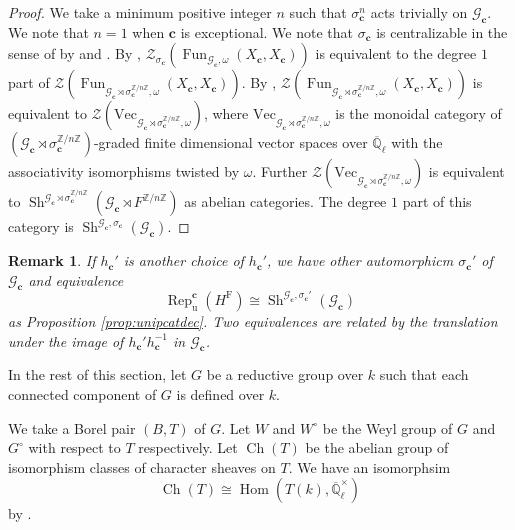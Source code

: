 \documentclass[12pt,a4paper]{article}
\newtheorem{rem}[thm]{Remark}
\DeclareMathOperator{\Hom}{Hom}
\DeclareMathOperator{\Rep}{Rep}
\DeclareMathOperator{\Sh}{Sh}
\DeclareMathOperator{\Fun}{Fun}
\DeclareMathOperator{\Ch}{Ch}
\newcommand{\mb}{\mathbb}
\newcommand{\mc}{\mathcal}
\newcommand{\mr}{\mathrm}
\newcommand{\mbf}{\mathbf}
\newcommand{\ol}{\overline}
\begin{document}
\begin{proof}
We take a minimum positive integer $n$ such that $\sigma_{\mbf{c}}^n$ acts trivially on $\mc{G}_{\mbf{c}}$. 
We note that $n=1$ when $\mbf{c}$ is exceptional. 
We note that $\sigma_{\mbf{c}}$ is centralizable in the sense of \cite[\S 5.1]{BrViQuanHopf} by \cite[Proposition 5.3]{BrViQuanHopf} and \cite[Proposition 5.1.7]{KeLyNonsemiTQFT}. 
By \cite[Theorem 5.12, Theorem 6.5]{BrViQuanHopf}, 
$\mc{Z}_{\sigma_{\mbf{c}}} (\Fun_{\mc{G}_{\mbf{c}},\omega} (X_{\mbf{c}}, X_{\mbf{c}}))$ is equivalent to the degree $1$ part of 
$\mc{Z} (\Fun_{\mc{G}_{\mbf{c}} \rtimes \sigma_{\mbf{c}}^{\mb{Z}/n\mb{Z}},\omega} (X_{\mbf{c}}, X_{\mbf{c}}))$. 
By \cite[Example 7.12.19, Corollary 7.16.2]{EGNOTenCat}, 
$\mc{Z} (\Fun_{\mc{G}_{\mbf{c}} \rtimes \sigma_{\mbf{c}}^{\mb{Z}/n\mb{Z}},\omega} (X_{\mbf{c}}, X_{\mbf{c}}))$ is equivalent to 
$\mc{Z} (\mr{Vec}_{\mc{G}_{\mbf{c}} \rtimes \sigma_{\mbf{c}}^{\mb{Z}/n\mb{Z}},\omega})$, where $\mr{Vec}_{\mc{G}_{\mbf{c}} \rtimes \sigma_{\mbf{c}}^{\mb{Z}/n\mb{Z}},\omega}$ is the monoidal category of $(\mc{G}_{\mbf{c}} \rtimes \sigma_{\mbf{c}}^{\mb{Z}/n\mb{Z}})$-graded finite dimensional vector spaces over $\ol{\mb{Q}}_{\ell}$ with the associativity isomorphisms twisted by $\omega$. 
Further $\mc{Z} (\mr{Vec}_{\mc{G}_{\mbf{c}} \rtimes \sigma_{\mbf{c}}^{\mb{Z}/n\mb{Z}},\omega})$ is equivalent to 
$\Sh^{\mc{G}_{\mbf{c}} \rtimes \sigma_{\mbf{c}}^{\mb{Z}/n\mb{Z}}}(\mc{G}_{\mbf{c}} \rtimes F^{\mb{Z}/n\mb{Z}})$ as abelian categories. 
The degree $1$ part of this category is 
$\Sh^{\mc{G}_{\mbf{c}},\sigma_{\mbf{c}}}(\mc{G}_{\mbf{c}})$. 
\end{proof}

\begin{rem}\label{rem:choiceh}
If $h_{\mbf{c}}'$ is another choice of $h_{\mbf{c}}'$, 
we have other automorphicm $\sigma_{\mbf{c}}'$ of $\mc{G}_{\mbf{c}}$ and equivalence 
	\[
\Rep_{\mr{u}}^{\mbf{c}}(H^{\mr{F}}) \cong 
\Sh^{\mc{G}_{\mbf{c}},\sigma_{\mbf{c}}'}(\mc{G}_{\mbf{c}})
\]
as Proposition \ref{prop:unipcatdec}. 
Two equivalences are related by the translation under the image of $h_{\mbf{c}}' h_{\mbf{c}}^{-1}$ in $\mc{G}_{\mbf{c}}$. 
\end{rem}

In the rest of this section, let $G$ be a reductive group over $k$ such that each connected component of $G$ is defined over $k$. 

We take a Borel pair $(B,T)$ of $G$. Let $W$ and $W^{\circ}$ be the Weyl group of $G$ and $G^{\circ}$ with respect to $T$ respectively. 
Let $\Ch (T)$ be the abelian group of isomorphism classes of character sheaves on $T$. We have an isomorphsim 
\begin{equation}\label{eq:chTiso}
 \Ch (T) \cong \Hom (T(k),\ol{\mb{Q}}_{\ell}^{\times}) 
\end{equation}
by \cite[A.3.3 Theorem]{YunRigAutLoc}. 
\end{document}
